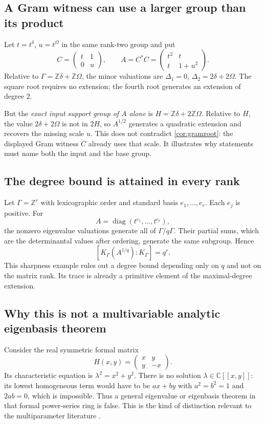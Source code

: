 \documentclass[11pt,letterpaper]{article}
\numberwithin{equation}{section}
\theoremstyle{definition}
\theoremstyle{remark}
\newcommand{\C}{\mathbb C}
\newcommand{\Z}{\mathbb Z}
\newcommand{\diag}{\operatorname{diag}}
\begin{document}
\subsection{A Gram witness can use a larger group than its product}

Let $t=t^\delta$, $u=t^\Omega$ in the same rank-two group and put
\[
 C=\begin{pmatrix}t&1\\0&u\end{pmatrix},\qquad
 A=C^*C=\begin{pmatrix}t^2&t\\t&1+u^2\end{pmatrix}.
\]
Relative to $\Gamma=\Z\delta+\Z\Omega$, the minor valuations are
$\Delta_1=0$, $\Delta_2=2\delta+2\Omega$. The square root requires no
extension; the fourth root generates an extension of degree $2$.

But the \emph{exact input support group of $A$ alone} is
$H=\Z\delta+2\Z\Omega$. Relative to $H$, the value
$2\delta+2\Omega$ is not in $2H$, so $A^{1/2}$ generates a quadratic
extension and recovers the missing scale $u$. This does not contradict
\cref{cor:gramroot}: the displayed Gram witness $C$ already uses that scale.
It illustrates why statements must name both the input and the base group.

\subsection{The degree bound is attained in every rank}

Let $\Gamma=\Z^r$ with lexicographic order and standard basis
$e_1,\ldots,e_r$. Each $e_j$ is positive. For
\[
 A=\diag(t^{e_1},\ldots,t^{e_r}),
\]
the nonzero eigenvalue valuations generate all of $\Gamma/q\Gamma$.
Their partial sums, which are the determinantal values after ordering,
generate the same subgroup. Hence
\[
 [K_\Gamma(A^{1/q}):K_\Gamma]=q^r.
\]
This sharpness example rules out a degree bound depending only on $q$ and
not on the matrix rank. Its trace is already a primitive element of the
maximal-degree extension.

\subsection{Why this is not a multivariable analytic eigenbasis theorem}

Consider the real symmetric formal matrix
\begin{equation}\label{eq:crossing}
 H(x,y)=\begin{pmatrix}x&y\\y&-x\end{pmatrix}.
\end{equation}
Its characteristic equation is $\lambda^2=x^2+y^2$. There is no solution
$\lambda\in\C[[x,y]]$: its lowest homogeneous term would have to be
$ax+by$ with $a^2=b^2=1$ and $2ab=0$, which is impossible.
Thus a general eigenvalue or eigenbasis theorem in that formal power-series
ring is false. This is the kind of distinction relevant to the
multiparameter literature \cite{PR,DLLZ}.
\end{document}

